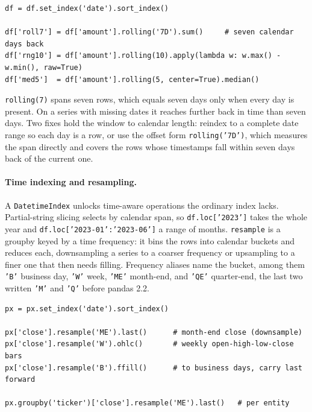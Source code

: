 \begin{lstlisting}[style=python, caption={A calendar window, a custom window, and a centered median}]
df = df.set_index('date').sort_index()

df['roll7'] = df['amount'].rolling('7D').sum()     # seven calendar days back
df['rng10'] = df['amount'].rolling(10).apply(lambda w: w.max() - w.min(), raw=True)
df['med5']  = df['amount'].rolling(5, center=True).median()
\end{lstlisting}

\vspace{2ex}

\begin{keybox}
\texttt{rolling(7)} spans seven rows, which equals seven days only when every day is present. On a series with missing dates it reaches further back in time than seven days. Two fixes hold the window to calendar length: reindex to a complete date range so each day is a row, or use the offset form \texttt{rolling('7D')}, which measures the span directly and covers the rows whose timestamps fall within seven days back of the current one.
\end{keybox}

\vspace{-1ex}

\paragraph{Time indexing and resampling.} A \texttt{DatetimeIndex} unlocks time-aware operations the ordinary index lacks. Partial-string slicing selects by calendar span, so \texttt{df.loc['2023']} takes the whole year and \texttt{df.loc['2023-01':'2023-06']} a range of months. \texttt{resample} is a groupby keyed by a time frequency: it bins the rows into calendar buckets and reduces each, downsampling a series to a coarser frequency or upsampling to a finer one that then needs filling. Frequency aliases name the bucket, among them \texttt{'B'} business day, \texttt{'W'} week, \texttt{'ME'} month-end, and \texttt{'QE'} quarter-end, the last two written \texttt{'M'} and \texttt{'Q'} before pandas 2.2.

\begin{lstlisting}[style=python, caption={Downsample, build OHLC bars, and align to business days}]
px = px.set_index('date').sort_index()

px['close'].resample('ME').last()      # month-end close (downsample)
px['close'].resample('W').ohlc()       # weekly open-high-low-close bars
px['close'].resample('B').ffill()      # to business days, carry last forward

px.groupby('ticker')['close'].resample('ME').last()   # per entity
\end{lstlisting}

